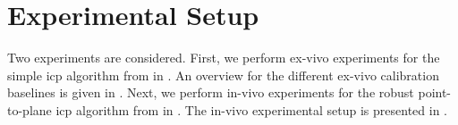 
\section{Experimental Setup}
\label{c1:sec:experimental_setup}
Two experiments are considered. First, we perform ex-vivo experiments for the simple \acrshort{icp} algorithm from  in . An overview for the different ex-vivo calibration baselines is given in . Next, we perform in-vivo experiments for the robust point-to-plane \acrshort{icp} algorithm from  in . The in-vivo experimental setup is presented in .

